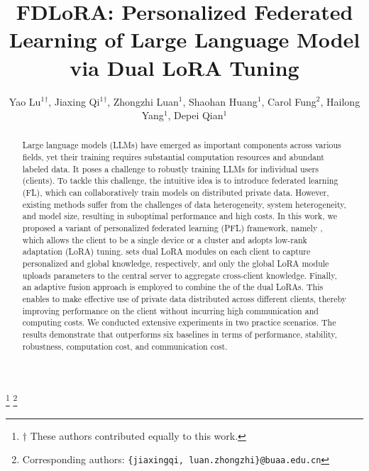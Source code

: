 \documentclass[sigconf]{acmart}
\newcommand\our{\text{FDLoRA}}
\begin{document}
\title{FDLoRA: Personalized Federated Learning of Large Language Model via Dual LoRA Tuning}


\author{
Yao Lu$^1$$^\dagger$,
Jiaxing Qi$^1$$^\dagger$,
Zhongzhi Luan$^1$,
Shaohan Huang$^1$,
Carol Fung$^2$,
Hailong Yang$^1$,
Depei Qian$^1$
}
\thanks{$\dagger$ These authors contributed equally to this work.}
\thanks{Corresponding authors: \texttt{\{jiaxingqi, luan.zhongzhi\}@buaa.edu.cn}}



\begin{abstract}
Large language models (LLMs) have emerged as important components across various fields, yet their training requires substantial computation resources and abundant labeled data. It poses a challenge to robustly training LLMs for individual users (clients). To tackle this challenge,  the intuitive idea is to introduce federated learning (FL), which can collaboratively train models on distributed private data. However, existing methods suffer from the challenges of data heterogeneity, system heterogeneity, and model size, resulting in suboptimal performance and high costs. In this work, we proposed a variant of personalized federated learning (PFL) framework, namely \our{}, which allows the client to be a single device or a cluster and adopts low-rank adaptation (LoRA) tuning. \our{} sets dual LoRA modules on each client to capture personalized and global knowledge, respectively, and only the global LoRA module uploads parameters to the central server to aggregate cross-client knowledge. Finally, an adaptive fusion approach is employed to combine the   of the dual LoRAs. This enables \our{} to make effective use of private data distributed across different clients, thereby improving performance on the client without incurring high communication and computing costs. We conducted extensive experiments in two practice scenarios. The results demonstrate that \our{} outperforms six baselines in terms of performance, stability, robustness, computation cost, and communication cost.
\end{abstract}
\end{document}
